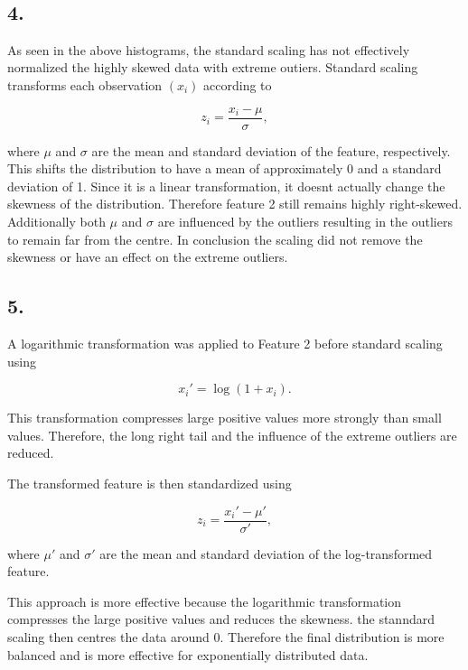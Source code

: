 \documentclass[11pt]{article}
\begin{document}
    \begin{center}
    \end{center}
    { \hspace*{\fill} \\}
    
    \subsection{4.}

As seen in the above histograms, the standard scaling has not
effectively normalized the highly skewed data with extreme outiers.
Standard scaling transforms each observation \((x_i)\) according to

\[
z_i = \frac{x_i-\mu}{\sigma},
\]

where \(\mu\) and \(\sigma\) are the mean and standard deviation of the
feature, respectively. This shifts the distribution to have a mean of
approximately 0 and a standard deviation of 1. Since it is a linear
transformation, it doesnt actually change the skewness of the
distribution. Therefore feature 2 still remains highly right-skewed.
Additionally both \(\mu\) and \(\sigma\) are influenced by the outliers
resulting in the outliers to remain far from the centre. In conclusion
the scaling did not remove the skewness or have an effect on the extreme
outliers.

    \subsection{5.}

A logarithmic transformation was applied to Feature 2 before standard
scaling using

\[
x_i' = \log(1+x_i).
\]

This transformation compresses large positive values more strongly than
small values. Therefore, the long right tail and the influence of the
extreme outliers are reduced.

The transformed feature is then standardized using

\[
z_i = \frac{x_i' - \mu'}{\sigma'},
\]

where \(\mu'\) and \(\sigma'\) are the mean and standard deviation of
the log-transformed feature.

This approach is more effective because the logarithmic transformation
compresses the large positive values and reduces the skewness. the
stanndard scaling then centres the data around 0. Therefore the final
distribution is more balanced and is more effective for exponentially
distributed data.
\end{document}
